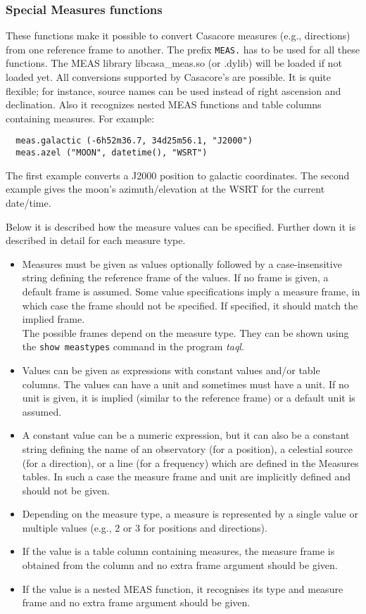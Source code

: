 \subsubsection{\label{TAQL:MEASFUNC}Special Measures functions}
These functions make it possible to convert Casacore measures (e.g.,
directions) from one reference frame to another.  The prefix
\texttt{MEAS.} has to be used for all these functions. The MEAS
library libcasa\_meas.so (or .dylib) will be loaded if not loaded yet.
All conversions supported by Casacore's 
are possible. It is quite flexible; for instance, source
names can be used instead of right ascension and declination. Also it recognizes
nested MEAS functions and table columns containing measures.
For example:
\begin{verbatim}
  meas.galactic (-6h52m36.7, 34d25m56.1, "J2000")
  meas.azel ("MOON", datetime(), "WSRT")
\end{verbatim}
The first example converts a J2000 position to galactic coordinates.
The second example gives the moon's azimuth/elevation at the WSRT for
the current date/time.

Below it is described how the measure values can be specified.
Further down it is described in detail for each measure type.
\begin{itemize}
\item Measures must be given as values optionally followed by a
  case-insensitive string defining the reference frame of the
  values. If no frame is given, a default frame is assumed.
  Some value specifications imply a measure frame, in which case
  the frame should not be specified. If specified, it should
  match the implied frame.
  \\The possible frames depend on the measure type. They
  can be shown using the
  {\tt show meastypes} command in the program {\em taql}.
\item Values can be given as expressions with constant values and/or table
  columns. The values can have a unit and sometimes must have a unit.
  If no unit is given, it is implied (similar to the reference frame)
  or a default unit is assumed.
\item A constant value can be a numeric expression, but
  it can also be a constant string defining the name of an
  observatory (for a position), a celestial source (for a direction),
  or a line (for a frequency) which are defined in the Measures tables.
  In such a case the measure frame and
  unit are implicitly defined and should not be given.
\item Depending on the measure type, a measure is represented by
  a single value or multiple values (e.g., 2 or 3 for positions and directions).
\item If the value is a table column containing measures, the
  measure frame is obtained from the column and no extra frame
  argument should be given.
\item If the value is a nested MEAS function, it recognises its type
  and measure frame and no extra frame argument should be given.
\end{itemize}

